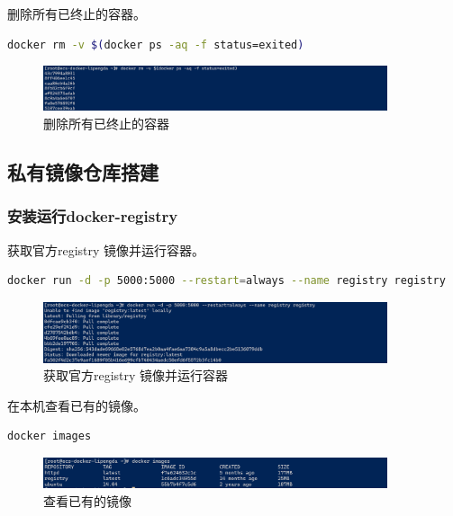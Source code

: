\documentclass{article}
\begin{document}
删除所有已终止的容器。

\begin{lstlisting}[language=bash]
    docker rm -v $(docker ps -aq -f status=exited)
\end{lstlisting}

\begin{figure}[H]
\centering
\includegraphics[width=0.9\textwidth]{img/0.2.4.4.3.png}
\caption{删除所有已终止的容器}
\end{figure}

\subsection{私有镜像仓库搭建}

\subsubsection{安装运行docker-registry}

获取官方registry 镜像并运行容器。

\begin{lstlisting}[language=bash]
    docker run -d -p 5000:5000 --restart=always --name registry registry
\end{lstlisting}

\begin{figure}[H]
\centering
\includegraphics[width=0.9\textwidth]{img/2.5.1.1.png}
\caption{获取官方registry 镜像并运行容器}
\end{figure}

在本机查看已有的镜像。

\begin{lstlisting}[language=bash]
    docker images
\end{lstlisting}

\begin{figure}[H]
\centering
\includegraphics[width=0.9\textwidth]{img/2.5.1.2.png}
\caption{查看已有的镜像}
\end{figure}
\end{document}
